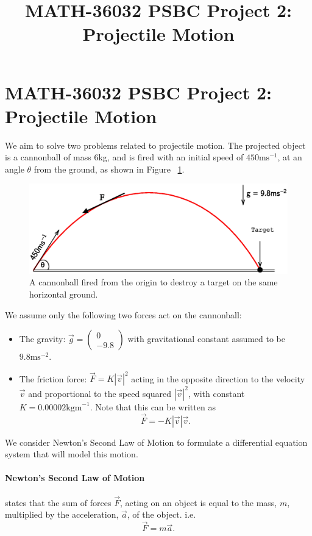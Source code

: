 \documentclass[11pt]{report}
\title{MATH-36032 PSBC Project 2: Projectile Motion}
\begin{document}
\section*{MATH-36032 PSBC Project 2: Projectile Motion}
We aim to solve two problems related to projectile motion. The projected object is a cannonball of mass $6$kg, and is fired with an initial speed of $450\text{ms}^{-1}$, at an angle $\theta$ from the ground, as shown in Figure ~\ref{fig:projectile1}.

\begin{figure}[h]
	\centering
  	\includegraphics[scale=0.5]{assets/projectile1.eps}
  	\caption{A cannonball fired from the origin to destroy a target on the same horizontal ground.}
  	\label{fig:projectile1}
\end{figure}

We assume only the following two forces act on the cannonball:
\begin{itemize}
	\item The gravity: $\vec{g} = \begin{pmatrix} 0 \\ -9.8 \end{pmatrix}$ with gravitational constant assumed to be $9.8\text{ms}^{-2}$.
	\item The friction force: $\vec{F}=K|\vec{v}|^2$ acting in the opposite direction to the velocity $\vec{v}$ and proportional to the speed squared $|\vec{v}|^2$, with constant $K=0.00002\text{kgm}^{-1}$. Note that this can be written as $$\vec{F}=-K|\vec{v}|\vec{v}.$$
\end{itemize}

We consider Newton's Second Law of Motion to formulate a differential equation system that will model this motion.
\paragraph{Newton's Second Law of Motion} states that the sum of forces $\vec{F}$, acting on an object is equal to the mass, $m$, multiplied by the acceleration, $\vec{a}$, of the object. i.e. $$\vec{F}=m\vec{a}.$$
\end{document}
